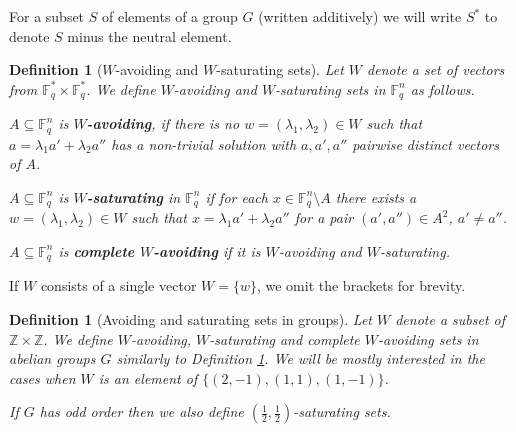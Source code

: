 \documentclass[11pt]{article}
\numberwithin{table}{section}
\newcommand{\F}{{\mathbb F}}
\newtheorem{definition}[theorem]{Definition}
\theoremstyle{definition}
\begin{document}
	
	
	For a subset $S$ of elements of a group  $G$ (written additively) we will write $S^*$ to denote $S$ minus the neutral element. 
	
	\begin{definition}[$W$-avoiding and $W$-saturating sets]
		\label{defavoid}
		Let $W$ denote a set of vectors from $\F_q^*\times \F_q^*$. 
		We define $W$-avoiding and $W$-saturating sets in $\F_q^n$ as follows. 
		
		$A\subseteq \F_q^n$ is  \textbf{$W$-avoiding}, if there is no $w=(\lambda_1, \lambda_2)\in W$ such that $a=\lambda_1a'+\lambda_2a''$ has a non-trivial solution 
		with $a,a',a''$ pairwise distinct vectors of $A$. 
		
		
		$A\subseteq \F_q^n$ is  \textbf{$W$-saturating} in $\F_q^n$ if for each    $x\in \F_q^n\setminus A$
		there exists a $w=(\lambda_1, \lambda_2)\in W$ such that $x=\lambda_1a'+\lambda_2a''$ for a pair $(a', a'')\in A^2$, $a'\neq a''$. 
		
		$A \subseteq \F_q^n$ is \textbf{complete $W$-avoiding} if it is $W$-avoiding and $W$-saturating. 
		
	\end{definition}
	
	
	
	If $W$ consists of a single vector $W=\{w\}$, we omit the brackets for brevity.
	
	
	\begin{definition}[Avoiding and saturating sets in groups]
		
		Let $W$ denote a subset of $\mathbb{Z}\times \mathbb{Z}$.   
		We define $W$-avoiding, $W$-saturating and complete $W$-avoiding sets in  abelian groups $G$ similarly to Definition \ref{defavoid}. We will be mostly interested in the cases when $W$ is an element of $\{(2,-1), (1,1),(1,-1)\}$. 
		
		If $G$ has odd order then we also define $(\frac12,\frac12)$-saturating sets.
		
	\end{definition}
	
\end{document}
